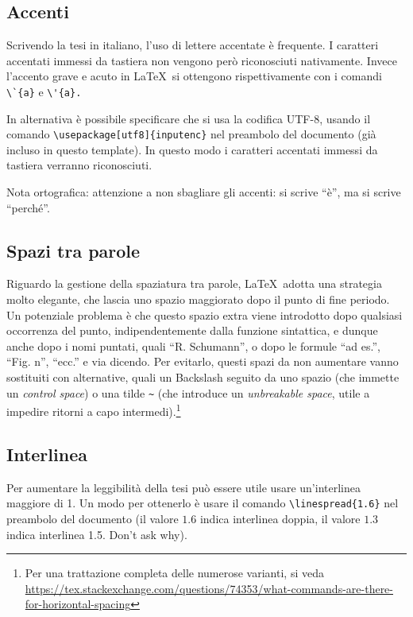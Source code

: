 \documentclass[12pt]{report}
\begin{document}
    \subsection{Accenti}

    Scrivendo la tesi in italiano, l'uso di lettere accentate \`e frequente. I caratteri accentati immessi da tastiera non vengono per\`o riconosciuti nativamente. Invece l'accento grave e acuto in \LaTeX\ si ottengono rispettivamente con i comandi \verb|\`{a}| e \verb|\'{a}.|

    In alternativa \`e possibile specificare che si usa la codifica UTF-8, usando il comando \verb|\usepackage[utf8]{inputenc}| nel preambolo del documento (già incluso in questo template). In questo modo i caratteri accentati immessi da tastiera verranno riconosciuti.

    Nota ortografica: attenzione a non sbagliare gli accenti: si scrive ``\`e'', ma si scrive ``perch\'e''.

    \subsection{Spazi tra parole}

    Riguardo la gestione della spaziatura tra parole, \LaTeX\ adotta una strategia molto elegante, che lascia uno spazio maggiorato dopo il punto di fine periodo. Un potenziale problema è che questo spazio extra viene introdotto dopo qualsiasi occorrenza del punto, indipendentemente dalla funzione sintattica, e dunque anche dopo i nomi puntati, quali ``R. Schumann'', o dopo le formule ``ad es.'', ``Fig. n'', ``ecc.'' e via dicendo. Per evitarlo, questi spazi da non aumentare vanno sostituiti con alternative, quali un Backslash seguito da uno spazio (che immette un \textit{control space}) o una tilde \verb|~| (che introduce un \textit{unbreakable space}, utile a impedire ritorni a capo intermedi).\footnote{Per una trattazione completa delle numerose varianti, si veda \url{https://tex.stackexchange.com/questions/74353/what-commands-are-there-for-horizontal-spacing}}

    \subsection{Interlinea}

    Per aumentare la leggibilit\`a della tesi pu\`o essere utile usare un'interlinea maggiore di 1. Un modo per ottenerlo \`e usare il comando \verb|\linespread{1.6}| nel preambolo del documento (il valore $1.6$ indica interlinea doppia, il valore $1.3$ indica interlinea 1.5. Don't ask why).
\end{document}
